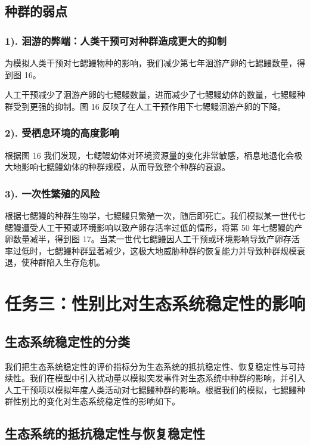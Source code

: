 \documentclass[11pt,a4paper]{ctexart}
\begin{document}
\subsection{种群的弱点}

\subsubsection*{1). 洄游的弊端：人类干预可对种群造成更大的抑制}

为模拟人类干预对七鳃鳗物种的影响，我们减少第七年洄游产卵的七鳃鳗数量，得到图 16。

人工干预减少了洄游产卵的七鳃鳗数量，进而减少了七鳃鳗幼体的数量，七鳃鳗种群受到更强的抑制。图 16 反映了在人工干预作用下七鳃鳗洄游产卵的下降。

\subsubsection*{2). 受栖息环境的高度影响}

根据图 16 我们发现，七鳃鳗幼体对环境资源量的变化非常敏感，栖息地退化会极大地影响七鳃鳗幼体的种群规模，从而导致整个种群的衰退。

\subsubsection*{3). 一次性繁殖的风险}

根据七鳃鳗的种群生物学，七鳃鳗只繁殖一次，随后即死亡。我们模拟某一世代七鳃鳗遭受人工干预或环境影响以致产卵存活率过低的情形，将第 50 年七鳃鳗的产卵数量减半，得到图 17。当某一世代七鳃鳗因人工干预或环境影响导致产卵存活率过低时，七鳃鳗种群显著减少，这极大地威胁种群的恢复能力并导致种群规模衰退，使种群陷入生存危机。

\section{任务三：性别比对生态系统稳定性的影响}

\subsection{生态系统稳定性的分类}

我们把生态系统稳定性的评价指标分为生态系统的抵抗稳定性、恢复稳定性与可持续性。我们在模型中引入扰动量以模拟突发事件对生态系统中种群的影响，并引入人工干预项以模拟年度人类活动对七鳃鳗种群的影响。根据我们的模拟，七鳃鳗种群性别比的变化对生态系统稳定性的影响如下。

\subsection{生态系统的抵抗稳定性与恢复稳定性}
\end{document}
